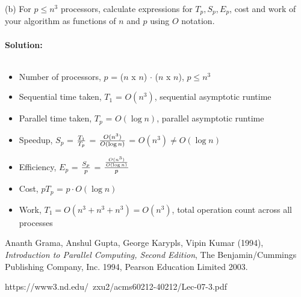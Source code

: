 \documentclass{article}
\begin{document}
\noindent(b) For $p \leq n^{3}$ processors, calculate expressions for $T_{p}, S_{p}, E_{p}$, 
cost and work of your algorithm as functions of $n$ and $p$ using $O$ notation.\\~\\
\textbf{Solution: }\\~\\
\begin{itemize}
    \item Number of processors, $p$ = ($n$ x $n$) $\cdot$ ($n$ x $n$), $p \leq n^{3}$
    \item Sequential time taken, $T_{1}$ = $O(n^{3})$, sequential asymptotic runtime
    \item Parallel time taken, $T_{p}$ = $O(\log n)$, parallel asymptotic runtime
    \item Speedup, $S_{p}$ = ${T_{1} \over T_{p}}$ = $O(n^{3}) \over O(\log n)$ = $O(n^{3}) \neq O(\log n)$
    \item Efficiency, $E_{p}$ = $S_{p} \over p$ = ${O(n^{3}) \over O(\log n)} \over p$
    \item Cost, $p T_{p}$ = $p \cdot O(\log n)$
    \item Work, $T_{1} = O(n^{3} + n^{3} + n^{3}) = O(n^{3})$, total operation count across all processes
\end{itemize}

\begin{thebibliography}{9}
    Ananth Grama, Anshul Gupta, George Karypls, Vipin Kumar (1994), \emph{Introduction to Parallel Computing, Second Edition},
    The Benjamin/Cummings Publishing Company, Inc. 1994, Pearson Education Limited 2003.

     https://www3.nd.edu/~zxu2/acms60212-40212/Lec-07-3.pdf



\end{thebibliography}
\end{document}
